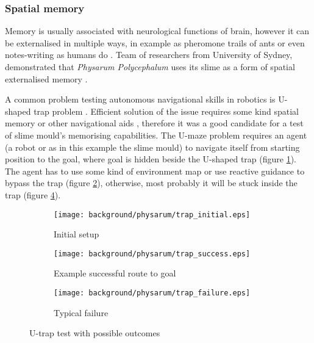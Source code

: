 \subsubsection{Spatial memory}

Memory is usually associated with neurological functions of brain, however it can be externalised in multiple ways, in example as pheromone trails of ants \cite{carroll1973ecology} or even notes-writing as humans do \cite{fisher1973effect}. Team of researchers from University of Sydney, demonstrated that \textit{Physarum Polycephalum} uses its slime as a form of spatial externalised memory \cite{reid2012slime}.

A common problem testing autonomous navigational skills in robotics is U-shaped trap problem \cite{chatterjee2001use}. Efficient solution of the issue requires some kind spatial memory or other navigational aids \cite{balch1993avoiding}, therefore it was a good candidate for a test of slime mould's memorising capabilities. The U-maze problem requires an agent (a robot or as in this example the slime mould) to navigate itself from starting position to the goal, where goal is hidden beside the U-shaped trap (figure \ref{figure:bp_trap_model}). The agent has to use some kind of environment map or use reactive guidance to bypass the trap (figure \ref{figure:bp_trap_model_success}), otherwise, most probably it will be stuck inside the trap (figure \ref{figure:bp_trap_model_failure}).

\begin{figure}
  \centering
  \begin{subfigure}{0.33\textwidth}
    \centering
    \texttt{[image: background/physarum/trap\_initial.eps]}
    \caption{Initial setup}
    \label{figure:bp_trap_model}
  \end{subfigure}
  \begin{subfigure}{0.37\textwidth}
    \centering
    \texttt{[image: background/physarum/trap\_success.eps]}
    \caption{Example successful route to goal}
    \label{figure:bp_trap_model_success}
  \end{subfigure}
  \begin{subfigure}{0.37\textwidth}
    \centering
    \texttt{[image: background/physarum/trap\_failure.eps]}
    \caption{Typical failure}
    \label{figure:bp_trap_model_failure}
  \end{subfigure}
  \caption{U-trap test with possible outcomes}
\end{figure}

